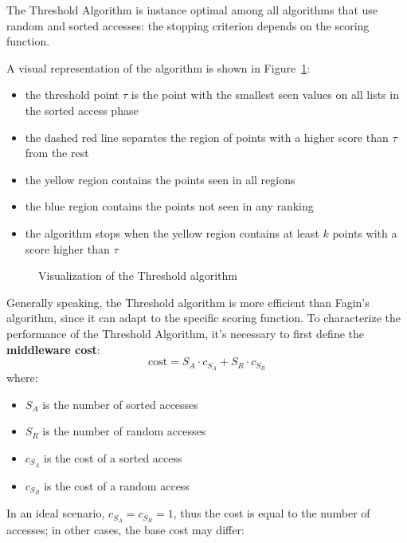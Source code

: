 \documentclass[english]{article}
\begin{document}
The Threshold Algorithm is instance optimal among all algorithms that use random and sorted accesses:
the stopping criterion depends on the scoring function.

A visual representation of the algorithm is shown in Figure~\ref{fig:treshold-algorithm}:

\begin{itemize}
  \item the threshold point \(\tau\) is the point with the smallest seen values on all lists in the sorted access phase
  \item the dashed red line separates the region of points with a higher score than \(\tau\) from the rest
  \item the yellow region contains the points seen in all regions
  \item the blue region contains the points not seen in any ranking
  \item the algorithm stops when the yellow region contains at least \(k\) points with a score higher than \(\tau\)
\end{itemize}

\begin{figure}[htbp]
  \centering
  \bigskip
  \caption{Visualization of the Threshold algorithm}
  \label{fig:treshold-algorithm}
  \bigskip
\end{figure}

Generally speaking, the Threshold algorithm is more efficient than Fagin's algorithm, since it can adapt to the specific scoring function.
To characterize the performance of the Threshold Algorithm, it's necessary to first define the \textbf{middleware cost}:
\[ \text{cost} = S_A \cdot c_{S_A} + S_R \cdot c_{S_R} \]
where:
\begin{itemize}
  \item \(S_A\) is the number of sorted accesses
  \item \(S_R\) is the number of random accesses
  \item \(c_{S_A}\) is the cost of a sorted access
  \item \(c_{S_R}\) is the cost of a random access
\end{itemize}

In an ideal scenario, \(c_{S_A} = c_{S_R} = 1\), thus the cost is equal to the number of accesses;
in other cases, the base cost may differ:
\end{document}

